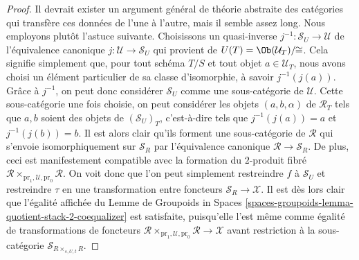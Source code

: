 \begin{proof}
\medskip\noindent
Il devrait exister un argument général de théorie abstraite des catégories
qui transfère ces données de l'une à l'autre, mais il semble
assez long. Nous employons plutôt l'astuce suivante.
Choisissons un quasi-inverse $j^{-1} : \mathcal{S}_U \to \mathcal{U}$
de l'équivalence canonique $j : \mathcal{U} \to \mathcal{S}_U$ qui provient
de $U(T) = \Ob(\mathcal{U}_T)/\!\!\cong$.
Cela signifie simplement que, pour tout schéma $T/S$ et tout
objet $a \in \mathcal{U}_T$, nous avons choisi un
élément particulier de sa classe d'isomorphie, à savoir $j^{-1}(j(a))$.
Grâce à $j^{-1}$, on peut donc considérer $\mathcal{S}_U$
comme une sous-catégorie de $\mathcal{U}$. Cette sous-catégorie une fois choisie,
on peut considérer les objets $(a, b, \alpha)$ de $\mathcal{R}_T$
tels que $a, b$ soient des objets de $(\mathcal{S}_U)_T$, c'est-à-dire tels
que $j^{-1}(j(a)) = a$ et $j^{-1}(j(b)) = b$. Il est alors clair qu'ils
forment une sous-catégorie de $\mathcal{R}$ qui s'envoie isomorphiquement
sur $\mathcal{S}_R$ par l'équivalence canonique
$\mathcal{R} \to \mathcal{S}_R$. De plus, ceci est manifestement compatible
avec la formation du $2$-produit fibré
$\mathcal{R} \times_{\text{pr}_1, \mathcal{U}, \text{pr}_0} \mathcal{R}$.
On voit donc que l'on peut simplement restreindre
$f$ à $\mathcal{S}_U$ et restreindre $\tau$ en une transformation
entre foncteurs $\mathcal{S}_R \to \mathcal{X}$. Il est dès lors clair que
l'égalité affichée du
Lemme de Groupoids in Spaces
\ref{spaces-groupoids-lemma-quotient-stack-2-coequalizer}
est satisfaite, puisqu'elle l'est même comme égalité de transformations de foncteurs
$\mathcal{R} \times_{\text{pr}_1, \mathcal{U}, \text{pr}_0} \mathcal{R}
\to \mathcal{X}$ avant restriction à la sous-catégorie
$\mathcal{S}_{R \times_{s, U, t} R}$.


\end{proof}
